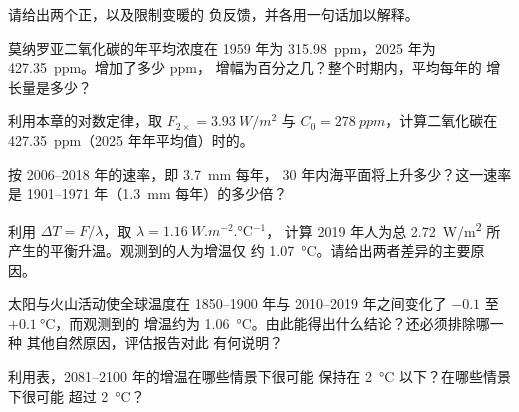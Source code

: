 \begin{exercise}[$\star$]\label{exo:g12:climate-change:5}
请给出两个正，以及限制变暖的
负反馈，并各用一句话加以解释。
\end{exercise}

\begin{exercise}[$\star\star$]\label{exo:g12:climate-change:6}
莫纳罗亚二氧化碳的年平均浓度在 1959 年为
\qty{315.98}{ppm}，2025 年为 \qty{427.35}{ppm}。增加了多少 ppm，
增幅为百分之几？整个时期内，平均每年的
增长量是多少？
\end{exercise}

\begin{exercise}[$\star\star$]\label{exo:g12:climate-change:7}
利用本章的对数定律，取 $F_{2\times} =
\qty{3.93}{W/m^2}$ 与 $C_0 = \qty{278}{ppm}$，计算二氧化碳在
\qty{427.35}{ppm}（2025 年年平均值）时的。
\end{exercise}

\begin{exercise}[$\star\star$]\label{exo:g12:climate-change:8}
按 2006--2018 年的速率，即 \qty{3.7}{mm} 每年，
30 年内海平面将上升多少？这一速率是
1901--1971 年（\qty{1.3}{mm} 每年）的多少倍？
\end{exercise}

\begin{exercise}[$\star\star$]\label{exo:g12:climate-change:9}
利用 $\Delta T = F/\lambda$，取 $\lambda = \qty{1.16}{W.m^{-2}.\degreeCelsius^{-1}}$，
计算 2019 年人为总
\qty{2.72}{W/m^2} 所产生的平衡升温。观测到的人为增温仅
约 \qty{1.07}{\degreeCelsius}。请给出两者差异的主要原因。
\end{exercise}

\begin{exercise}[$\star\star$]\label{exo:g12:climate-change:10}
太阳与火山活动使全球温度在 1850--1900 年与
2010--2019 年之间变化了 $-0.1$ 至 $+\qty{0.1}{\degreeCelsius}$，而观测到的
增温约为 \qty{1.06}{\degreeCelsius}。由此能得出什么结论？还必须排除哪一种
其他自然原因，评估报告对此
有何说明？
\end{exercise}

\begin{exercise}[$\star\star$]\label{exo:g12:climate-change:11}
利用表，2081--2100 年的增温在哪些情景下很可能
保持在 \qty{2}{\degreeCelsius} 以下？在哪些情景下很可能
超过 \qty{2}{\degreeCelsius}？
\end{exercise}

